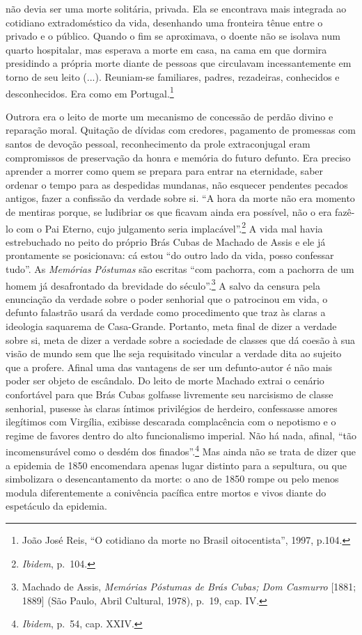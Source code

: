 não devia ser uma morte solitária, privada. Ela se encontrava mais
integrada ao cotidiano extradoméstico da vida, desenhando uma fronteira
tênue entre o privado e o público. Quando o fim se aproximava, o doente
não se isolava num quarto hospitalar, mas esperava a morte em casa, na
cama em que dormira presidindo a própria morte diante de pessoas que
circulavam incessantemente em torno de seu leito (...). Reuniam-se
familiares, padres, rezadeiras, conhecidos e desconhecidos. Era como em
Portugal.\footnote{João José Reis, ``O cotidiano da morte no Brasil
  oitocentista'', 1997, p.104.}

Outrora era o leito de morte um mecanismo de concessão de perdão divino
e reparação moral. Quitação de dívidas com credores, pagamento de
promessas com santos de devoção pessoal, reconhecimento da prole
extraconjugal eram compromissos de preservação da honra e memória do
futuro defunto. Era preciso aprender a morrer como quem se prepara para
entrar na eternidade, saber ordenar o tempo para as despedidas mundanas,
não esquecer pendentes pecados antigos, fazer a confissão da verdade
sobre si. ``A hora da morte não era momento de mentiras porque, se
ludibriar os que ficavam ainda era possível, não o era fazê-lo com o Pai
Eterno, cujo julgamento seria implacável''.\footnote{\emph{Ibidem},
  p.~104.} A vida mal havia estrebuchado no peito do próprio Brás Cubas
de Machado de Assis e ele já prontamente se posicionava: cá estou ``do
outro lado da vida, posso confessar tudo''. As \emph{Memórias Póstumas}
são escritas ``com pachorra, com a pachorra de um homem já desafrontado
da brevidade do século''.\footnote{Machado de Assis, \emph{Memórias
  Póstumas de Brás Cubas; Dom Casmurro} {[}1881; 1889{]} (São Paulo,
  Abril Cultural, 1978), p.~19, cap. IV.} A salvo da censura pela
enunciação da verdade sobre o poder senhorial que o patrocinou em vida,
o defunto falastrão usará da verdade como procedimento que traz às
claras a ideologia saquarema de Casa-Grande. Portanto, meta final de
dizer a verdade sobre si, meta de dizer a verdade sobre a sociedade de
classes que dá coesão à sua visão de mundo sem que lhe seja requisitado
vincular a verdade dita ao sujeito que a profere. Afinal uma das
vantagens de ser um defunto-autor é não mais poder ser objeto de
escândalo. Do leito de morte Machado extrai o cenário confortável para
que Brás Cubas golfasse livremente seu narcisismo de classe senhorial,
pusesse às claras íntimos privilégios de herdeiro, confessasse amores
ilegítimos com Virgília, exibisse descarada complacência com o nepotismo
e o regime de favores dentro do alto funcionalismo imperial. Não há
nada, afinal, ``tão incomensurável como o desdém dos
finados''.\footnote{\emph{Ibidem}, p.~54, cap. XXIV.} Mas ainda não se
trata de dizer que a epidemia de 1850 encomendara apenas lugar distinto
para a sepultura, ou que simbolizara o desencantamento da morte: o ano
de 1850 rompe ou pelo menos modula diferentemente a conivência pacífica
entre mortos e vivos diante do espetáculo da epidemia.

